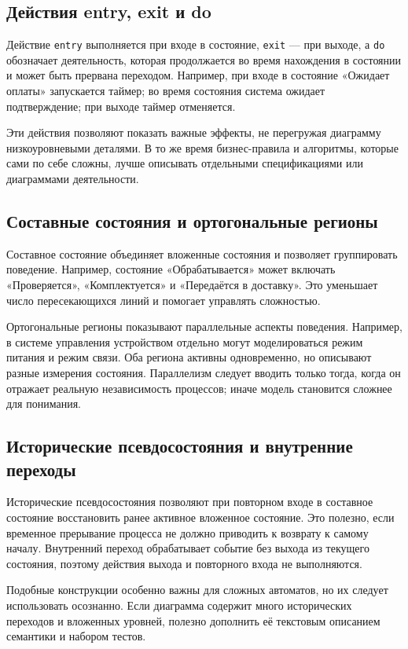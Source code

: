 \documentclass[essay,paper]{pmk-graduate}
\begin{document}
\subsection{Действия entry, exit и do}

Действие \texttt{entry} выполняется при входе в состояние, \texttt{exit} — при выходе, а \texttt{do} обозначает деятельность, которая продолжается во время нахождения в состоянии и может быть прервана переходом. Например, при входе в состояние «Ожидает оплаты» запускается таймер; во время состояния система ожидает подтверждение; при выходе таймер отменяется.

Эти действия позволяют показать важные эффекты, не перегружая диаграмму низкоуровневыми деталями. В то же время бизнес-правила и алгоритмы, которые сами по себе сложны, лучше описывать отдельными спецификациями или диаграммами деятельности.

\subsection{Составные состояния и ортогональные регионы}

Составное состояние объединяет вложенные состояния и позволяет группировать поведение. Например, состояние «Обрабатывается» может включать «Проверяется», «Комплектуется» и «Передаётся в доставку». Это уменьшает число пересекающихся линий и помогает управлять сложностью.

Ортогональные регионы показывают параллельные аспекты поведения. Например, в системе управления устройством отдельно могут моделироваться режим питания и режим связи. Оба региона активны одновременно, но описывают разные измерения состояния. Параллелизм следует вводить только тогда, когда он отражает реальную независимость процессов; иначе модель становится сложнее для понимания.

\subsection{Исторические псевдосостояния и внутренние переходы}

Исторические псевдосостояния позволяют при повторном входе в составное состояние восстановить ранее активное вложенное состояние. Это полезно, если временное прерывание процесса не должно приводить к возврату к самому началу. Внутренний переход обрабатывает событие без выхода из текущего состояния, поэтому действия выхода и повторного входа не выполняются.

Подобные конструкции особенно важны для сложных автоматов, но их следует использовать осознанно. Если диаграмма содержит много исторических переходов и вложенных уровней, полезно дополнить её текстовым описанием семантики и набором тестов.
\end{document}
